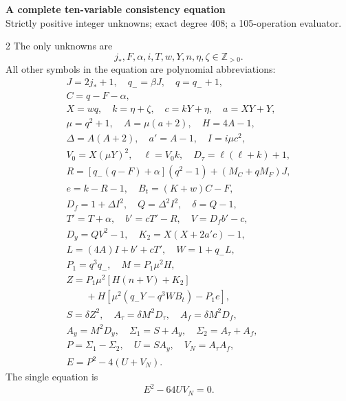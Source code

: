 \documentclass[10pt]{article}
\begin{document}
\begin{center}
{\large\bfseries A complete ten-variable consistency equation}\\[-1pt]
{\small Strictly positive integer unknowns; exact degree 408; a 105-operation evaluator.}
\end{center}\vspace{-8pt}
\begin{multicols}{2}
\fontsize{9}{9.5}\selectfont
The only unknowns are
\[
j_*,F,\alpha,i,T,w,Y,n,\eta,\zeta\in\mathbb Z_{>0}.
\]
All other symbols in the equation are polynomial abbreviations:
\[
\begin{gathered}
J=2j_*+1,\quad q_-=\beta J,\quad q=q_-+1,\\
C=q-F-\alpha,\\
X=wq,\quad k=\eta+\zeta,\quad c=kY+\eta,\quad a=XY+Y,\\
\mu=q^2+1,\quad A=\mu(a+2),\quad H=4A-1,\\
\Delta=A(A+2),\quad a'=A-1,\quad I=i\mu c^2,\\
V_0=X(\mu Y)^2,\quad\ell=V_0k,\quad D_\tau=\ell(\ell+k)+1,\\
R=[q_-(q-F)+\alpha](q^2-1)+(M_C+qM_F)J,\\
e=k-R-1,\quad B_t=(K+w)C-F,\\
D_f=1+\Delta I^2,\quad Q=\Delta^2I^2,\quad\delta=Q-1,\\
T'=T+\alpha,\quad b'=cT'-R,\quad V=D_fb'-c,\\
D_y=QV^2-1,\quad K_2=X(X+2a'c)-1,\\
L=(4A)I+b'+cT',\quad W=1+q_-L,\\
P_1=q^3q_-,\quad M=P_1\mu^2H,\\
Z=P_1\mu^2[H(n+V)+K_2]\\
\qquad+H[\mu^2(q_-Y-q^3WB_t)-P_1e],\\
S=\delta Z^2,\quad A_\tau=\delta M^2D_\tau,\quad A_f=\delta M^2D_f,\\
A_y=M^2D_y,\quad\Sigma_1=S+A_y,\quad\Sigma_2=A_\tau+A_f,\\
P=\Sigma_1-\Sigma_2,\quad U=SA_y,\quad V_N=A_\tau A_f,\\
E=P^2-4(U+V_N).
\end{gathered}
\]
The single equation is
\[
\boxed{E^2-64UV_N=0.}
\]


\end{multicols}
\end{document}
